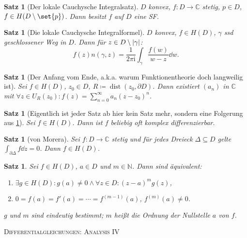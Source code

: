 \documentclass[a4paper]{article}
\theoremstyle{marginbreak}
\newtheorem{satz}[definition]{Satz}
\newcommand{\C}{\mathbb{C}}
\renewcommand{\i}{\mathrm{i}}
\DeclareMathOperator{\dist}{dist}
\begin{document}
	\begin{satz}[Der lokale Cauchysche Integralsatz]
		$D$ konvex, $f\colon D\to\C$ stetig, $p\in D$, $f\in H(D\setminus\set{p})$.
		Dann besitzt $f$ auf $D$ eine SF.
	\end{satz}
	\begin{satz}[Die lokale Cauchysche Integralformel]
		$D$ konvex, $f\in H(D)$, $\gamma$ ssd geschlossener Weg in $D$. Dann für $z\in D\setminus\abs{\gamma}$:
		\[
			f(z)n(\gamma, z)=\frac{1}{2\pi\i}\int_\gamma\frac{f(w)}{w-z}\dd{w}.
		\]
	\end{satz}
	\begin{satz}[Der Anfang vom Ende, a.k.a. warum Funktionentheorie doch langweilig ist]\label{pre}
		Sei $f\in H(D)$, $z_0\in D$, $R\coloneqq\dist(z_0,\partial D)$. Dann existiert $(a_n)$ in $\C$ mit
		$\forall z\in U_R(z_0): f(z)=\sum_{n=0}^\infty a_n(z-z_0)^n$.
	\end{satz}
	\begin{satz}[Eigentlich ist jeder Satz ab hier kein Satz mehr, sondern eine Folgerung aus \ref{pre}]
		Sei $f\in H(D)$. Dann ist $f$ beliebig oft komplex differenzierbar.
	\end{satz}
	\begin{satz}[von Morera]
		Sei $f\colon D\to\C$ stetig und für jedes Dreieck $\Delta\subseteq D$ gelte
		$\int_{\partial\Delta}f\dd{z}=0$. Dann $f\in H(D)$.
	\end{satz}
	\begin{satz}
		Sei $f\in H(D)$, $a\in D$ und $m\in\mathbb{N}$. Dann sind äquivalent:
		\begin{enumerate}[label=(\alph*)]
			\item $\exists g\in H(D): g(a)\neq 0\wedge \forall z\in D: (z-a)^mg(z)$,
			\item $0=f(a)=f'(a)=\cdots=f^{(m-1)}(a)$, $f^{(m)}(a)\neq 0$.
		\end{enumerate}
		$g$ und $m$ sind eindeutig bestimmt; $m$ heißt die Ordnung der Nullstelle $a$ von $f$.
	\end{satz}
	\newpage
	\textsc{Differentialgleichungen: Analysis IV}
\end{document}
